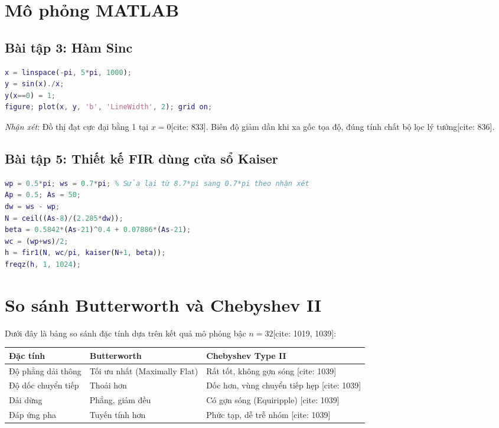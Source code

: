 \documentclass[12pt,a4paper]{article}
\begin{document}
\section{Mô phỏng MATLAB}
\subsection{Bài tập 3: Hàm Sinc}
\begin{lstlisting}[language=Matlab]
% bãi tập 3: biểu diễn hàm sinc(x) = sin(x)/x
x = linspace(-pi, 5*pi, 1000);
y = sin(x)./x;
y(x==0) = 1;
figure; plot(x, y, 'b', 'LineWidth', 2); grid on;
\end{lstlisting}
\textit{Nhận xét}: Đồ thị đạt cực đại bằng 1 tại $x=0$[cite: 833]. Biên độ giảm dần khi xa gốc tọa độ, đúng tính chất bộ lọc lý tưởng[cite: 836].

\subsection{Bài tập 5: Thiết kế FIR dùng cửa sổ Kaiser}
\begin{lstlisting}[language=Matlab]
wp = 0.5*pi; ws = 0.7*pi; % Sửa lại từ 8.7*pi sang 0.7*pi theo nhận xét
Ap = 0.5; As = 50;
dw = ws - wp;
N = ceil((As-8)/(2.285*dw));
beta = 0.5842*(As-21)^0.4 + 0.07886*(As-21);
wc = (wp+ws)/2;
h = fir1(N, wc/pi, kaiser(N+1, beta));
freqz(h, 1, 1024);
\end{lstlisting}

\section{So sánh Butterworth và Chebyshev II}
Dưới đây là bảng so sánh đặc tính dựa trên kết quả mô phỏng bậc $n=32$[cite: 1019, 1039]:

\begin{table}[H]
\centering
\begin{tabular}{@{}lll@{}}
\toprule
\textbf{Đặc tính} & \textbf{Butterworth} & \textbf{Chebyshev Type II} \\ \midrule
Độ phẳng dải thông & Tối ưu nhất (Maximally Flat) & Rất tốt, không gợn sóng [cite: 1039] \\
Độ dốc chuyển tiếp & Thoải hơn & Dốc hơn, vùng chuyển tiếp hẹp [cite: 1039] \\
Dải dừng & Phẳng, giảm đều & Có gợn sóng (Equiripple) [cite: 1039] \\
Đáp ứng pha & Tuyến tính hơn & Phức tạp, dễ trễ nhóm [cite: 1039] \\ \bottomrule
\end{tabular}
\end{table}
\end{document}
